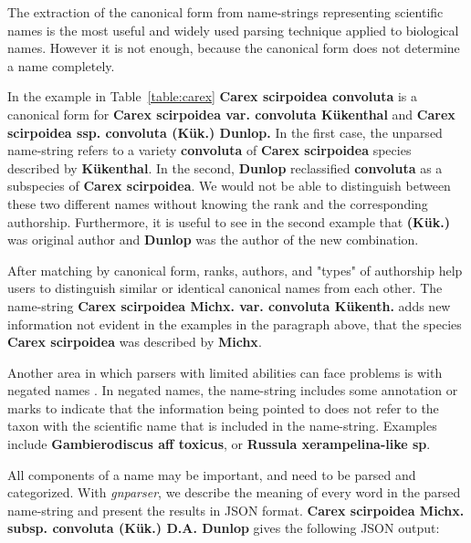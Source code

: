 \documentclass{bmcart}
\begin{document}
The extraction of the canonical form from name-strings representing scientific
names is the most useful and widely used parsing technique applied to
biological names. However it is not enough, because the canonical form does not
determine a name completely.

In the example in Table~\ref{table:carex} \textbf{Carex scirpoidea convoluta}
is a canonical form for \textbf{Carex scirpoidea var. convoluta Kükenthal} and
\textbf{Carex scirpoidea ssp. convoluta (Kük.) Dunlop.} In the first case, the
unparsed name-string refers to a variety \textbf{convoluta} of \textbf{Carex
scirpoidea} species described by \textbf{Kükenthal}. In the second,
\textbf{Dunlop} reclassified \textbf{convoluta} as a subspecies of
\textbf{Carex scirpoidea}. We would not be able to distinguish between these
two different names without knowing the rank and the corresponding authorship.
Furthermore, it is useful to see in the second example that \textbf{(Kük.)} was
original author and \textbf{Dunlop} was the author of the new combination.

After matching by canonical form, ranks, authors, and "types" of authorship
help users to distinguish similar or identical canonical names from each other.
The name-string \textbf{Carex scirpoidea Michx. var. convoluta Kükenth.} adds
new information not evident in the examples in the paragraph above, that the
species \textbf{Carex scirpoidea} was described by \textbf{Michx}.

Another area in which parsers with limited abilities can face  problems is with
negated names \cite{Patterson:inpress-a}. In negated names, the name-string
includes some annotation or marks to indicate that the information being
pointed to does not refer to the taxon with the scientific name that is
included in the name-string. Examples include \textbf{Gambierodiscus aff
toxicus}, or \textbf{Russula xerampelina-like sp}.

All components of a name may be important, and need to be parsed and
categorized. With \textit{gnparser}, we describe the meaning of every word in
the parsed name-string and present the results in JSON format.  \textbf{Carex
scirpoidea Michx.  subsp. convoluta (Kük.) D.A. Dunlop} gives the following
JSON output:

\vspace{0.5cm}
\end{document}

